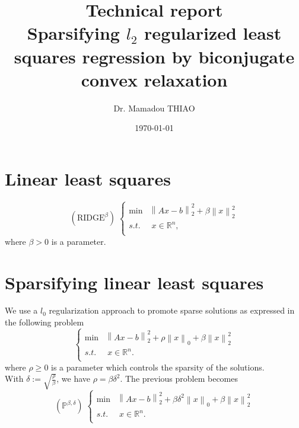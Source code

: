 \documentclass[fleqn]{report} %
\title{Technical report\\Sparsifying $l_2$ regularized least squares regression by biconjugate convex relaxation} %
\author{Dr. Mamadou THIAO} %
\date{\today} %
\newcommand\ddfrac[2]{\frac{\displaystyle #1}{\displaystyle #2}}
\begin{document}
    \maketitle %
    \tableofcontents
    \section{Linear least squares} %
\begin{equation}
		\label{Ridge_Regularization}
		(\text{RIDGE}^{\beta})\;
		\left\{
		\begin{array}{ll}\min & \left\|Ax-b\right\|^2_2
			+ \beta\left\|x\right\|_2^2\\
			s.t.&\;x\in\mathbb{R}^n,\\
		\end{array} 
		\right.
    \end{equation}
		where $\beta> 0$ is a parameter.
    \section{Sparsifying linear least squares} %
We use a $l_0$ regularization approach to promote sparse solutions as expressed in the following problem
		\begin{equation}
		\left\{
		\begin{array}{ll}\min & \left\|Ax-b\right\|^2_2 + \rho\left\|x\right\|_0 + \beta\left\|x\right\|^2_2  \\
			s.t.&\;x\in\mathbb{R}^n.\\
		\end{array} 
		\right.
    \end{equation}
		where $\rho \geq 0$ is a parameter which controls the sparsity of the solutions. \\
With $\delta := \sqrt{\ddfrac{\rho}{\beta}}$, we have $\rho = \beta\delta^2$. The previous problem  becomes
\begin{equation}
		\label{L0_L2_Regularized_Sparse_Approximation}
		(\mathbb{P}^{\beta, \delta})\;
		\left\{
		\begin{array}{ll}\min & \left\|Ax-b\right\|^2_2 + \beta\delta^2\left\|x\right\|_0 + \beta\left\|x\right\|^2_2 \\
			s.t.&\;x\in\mathbb{R}^n.\\
		\end{array} 
		\right.
    \end{equation}
\end{document}
